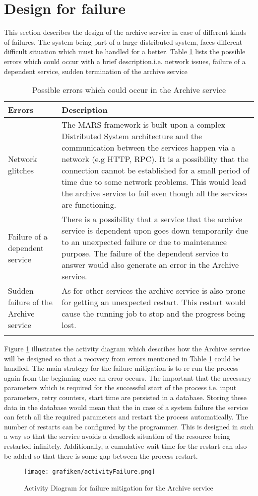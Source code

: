 \section{Design for failure}
This section describes the design of the archive service in case of different kinds of failures. The system being part of a large distributed system,
faces different difficult situation which must be handled for a better. Table \ref{table:probServices} lists the possible errors which 
could occur with a brief description.i.e. network issues, failure of a 
dependent service, sudden termination of the archive service 
\begin{longtable}{|p{4cm}|p{10cm}|}
    \hline
        \textbf{Errors}  & \textbf{Description}\\
    \hline
        Network glitches & The MARS framework is built upon a complex Distributed System architecture and the communication between the services
        happen via a network (e.g HTTP, RPC). It is a possibility that the connection cannot be established for a small period of time due to some network problems.
        This would lead the archive service to fail even though all the services are functioning.\\
    \hline
        Failure of a dependent service & There is a possibility that a service that the archive service is dependent upon goes down temporarily due to an unexpected
        failure or due to maintenance purpose. The failure of the dependent service to answer would also generate an error in the Archive service.\\
    \hline
        Sudden failure of the Archive service & As for other services the archive service is also prone for getting an unexpected restart. This restart would cause
        the running job to stop and the progress being lost.\\    
    \hline
    \caption{Possible errors which could occur in the Archive service}
    \label{table:probServices} 
\end{longtable}

Figure \ref{fig:activityFailure} illustrates the activity diagram which describes how the Archive service will be designed so that a recovery from errors mentioned in
Table \ref{table:probServices} could be handled. The main strategy for the failure mitigation is to re run the process again from the beginning once an error occurs. 
The important that the necessary parameters which is required for the successful start of the process i.e. input parameters, retry counters, start time are persisted
in a database. Storing these data in the database would mean that the in case of a system failure the service can fetch all the required parameters and restart the 
process automatically. The number of restarts can be configured by the programmer. This is designed in such a way so that the service avoids a deadlock situation of the
resource being restarted infinitely. Additionally, a cumulative wait time for the restart can also be added so that there is some gap between the process restart.

\begin{figure}[H]
    \centering \texttt{[image: grafiken/activityFailure.png]}
    \caption{Activity Diagram for failure mitigation for the Archive service \cite{Hangfire}}
    \label{fig:activityFailure}
\end{figure}
